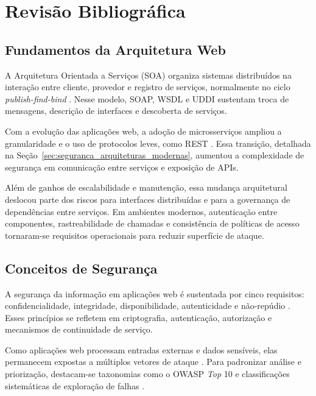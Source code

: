 \section{
    Revisão Bibliográfica
} \label{sec:revisao_bibliografica}

\subsection{Fundamentos da Arquitetura Web}

A Arquitetura Orientada a Serviços (SOA) organiza sistemas distribuídos na interação entre cliente, provedor e registro de serviços, normalmente no ciclo \textit{publish-find-bind} \cite{Mello2006SegurancaServicosWeb}. Nesse modelo, SOAP, WSDL e UDDI sustentam troca de mensagens, descrição de interfaces e descoberta de serviços.

Com a evolução das aplicações web, a adoção de microsserviços ampliou a granularidade e o uso de protocolos leves, como REST \cite{Pahl2016MicroservicesSurvey}. Essa transição, detalhada na Seção~\ref{sec:seguranca_arquiteturas_modernas}, aumentou a complexidade de segurança em comunicação entre serviços e exposição de APIs.

Além de ganhos de escalabilidade e manutenção, essa mudança arquitetural deslocou parte dos riscos para interfaces distribuídas e para a governança de dependências entre serviços. Em ambientes modernos, autenticação entre componentes, rastreabilidade de chamadas e consistência de políticas de acesso tornaram-se requisitos operacionais para reduzir superfície de ataque.

\subsection{Conceitos de Segurança}

A segurança da informação em aplicações web é sustentada por cinco requisitos: confidencialidade, integridade, disponibilidade, autenticidade e não-repúdio \cite{Mello2006SegurancaServicosWeb}. Esses princípios se refletem em criptografia, autenticação, autorização e mecanismos de continuidade de serviço.

Como aplicações web processam entradas externas e dados sensíveis, elas permanecem expostas a múltiplos vetores de ataque \cite{Yadav2018WebAppSecurity}. Para padronizar análise e priorização, destacam-se taxonomias como o OWASP \textit{Top} 10 \cite{OWASP2021Top10} e classificações sistemáticas de exploração de falhas \cite{Shahriar2011SecurityVulnerabilityTaxonomy}.

